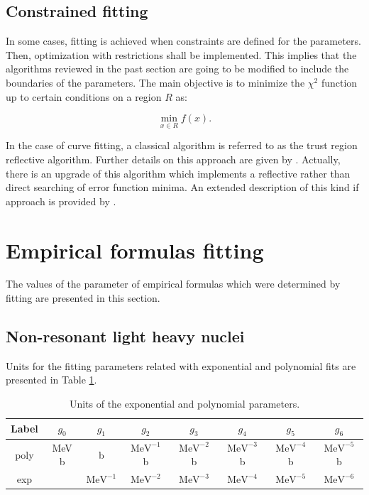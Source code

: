 \documentclass[openany]{book}
\begin{document}
\subsection{Constrained fitting} \label{sub:constrainedFitting}

In some cases, fitting is achieved when constraints are defined for the parameters. Then, optimization with restrictions shall be implemented. This implies that the algorithms reviewed in the past section are going to be modified to include the boundaries of the parameters. The main objective is to minimize the $\chi^2$ function up to certain conditions on a region $R$ as:

\begin{equation}\label{eq:constrained_fitting_definition}
	\min_{x \in R} f(x).
\end{equation}

In the case of curve fitting, a classical algorithm is referred to as the trust region reflective algorithm. Further details on this approach are given by \cite{branch_coleman_li_1999}. Actually, there is an upgrade of this algorithm  which implements a reflective rather than direct searching of error function minima. An extended description of this kind if approach is provided by \cite{coleman_li_1994}.  \\ 


\section{Empirical formulas fitting} \label{sec:empiricalFitting}

The values of the parameter of empirical formulas which were determined by fitting are presented in this section. \\

\subsection{Non-resonant light heavy nuclei}\label{sub:fitting_nonResonant}

Units for the fitting parameters related with exponential and polynomial fits are presented in Table \ref{table:fitting_empirical_polyexp_units}.

\begin{table}[H]
	\centering
	\begin{tabular}{|c|c|c|c|c|c|c|c|}
		\hline
		Label & $g_0$ & $g_1$  & $g_2$   & $g_3$ &  $g_4$ &  $g_5$ & $g_6$   \\  \hline
		poly &  MeV b & b & $\mathrm{{MeV}^{-1}}$ b &  $\mathrm{{MeV}^{-2}}$ b &  $\mathrm{{MeV}^{-3}}$ b & $\mathrm{{MeV}^{-4}}$ b & $\mathrm{{MeV}^{-5}}$ b  \\  \hline
		exp &  &  $\mathrm{{MeV}^{-1}}$  & $\mathrm{{MeV}^{-2}}$  &  $\mathrm{{MeV}^{-3}}$  &  $\mathrm{{MeV}^{-4}}$  &  $\mathrm{{MeV}^{-5}}$ & $\mathrm{{MeV}^{-6}}$    \\ \hline
	\end{tabular}
	\caption[Units of the exponential and polynomial parameters.]{Units of the exponential and polynomial parameters.}
	\label{table:fitting_empirical_polyexp_units}
\end{table}
\end{document}
